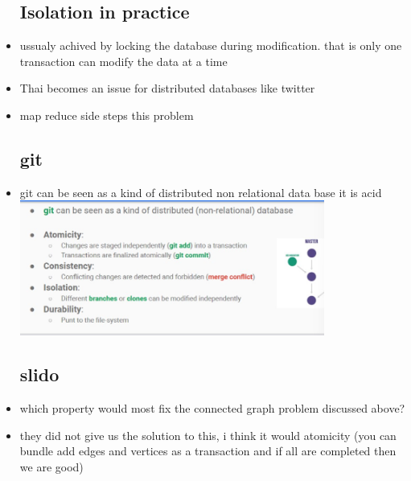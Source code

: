 \documentclass{article}
\begin{document}
\begin{itemize}
\subsection{Isolation in practice}
\item ussualy achived by locking the database during modification. that is only one transaction can modify the data at a time 
\item Thai becomes an issue for distributed databases like twitter
\item map reduce side steps this problem 
\subsection{git}
\item git can be seen as a kind of distributed non relational data base 
\iteim it is acid \\\includegraphics[width=10cm]{lecture notes/week 2/immages/w_1_7.jpg}
\subsection{slido}
\item which property would most fix the connected graph problem discussed above?
\item they did not give us the solution to this, i think it would atomicity (you can bundle add edges and vertices as a transaction and if all are completed then we are good)




\end{itemize}
\end{document}
